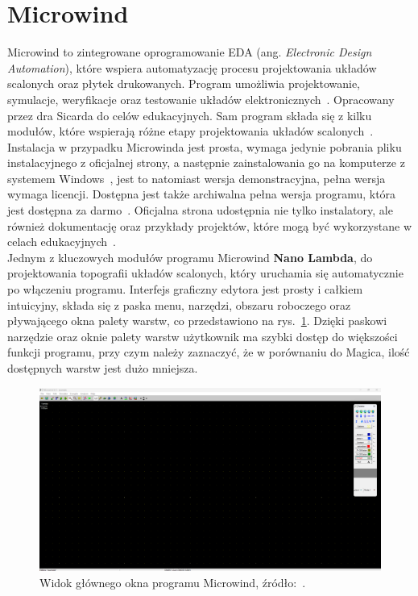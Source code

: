 \section{Microwind}

Microwind to zintegrowane oprogramowanie EDA (ang. \textit{Electronic Design Automation}),
które wspiera automatyzację procesu projektowania układów scalonych oraz płytek drukowanych.
Program umożliwia projektowanie, symulacje, weryfikacje oraz testowanie układów elektronicznych~\cite{eda}.
Opracowany przez dra Sicarda do celów edukacyjnych.
Sam program składa się z kilku modułów,
które wspierają różne etapy projektowania układów scalonych~\cite{Microwind}.
Instalacja w przypadku Microwinda jest prosta, wymaga jedynie pobrania pliku instalacyjnego z oficjalnej strony,
a następnie zainstalowania go na komputerze z systemem Windows~\cite{Microwind},
jest to natomiast wersja demonstracyjna, pełna wersja wymaga licencji.
Dostępna jest także archiwalna pełna wersja programu, która jest dostępna za darmo~\cite{old_microwind}.
Oficjalna strona udostępnia nie tylko instalatory, ale również dokumentację oraz przykłady projektów,
które mogą być wykorzystane w celach edukacyjnych~\cite{Microwind}.\\
\indent Jednym z kluczowych modułów programu Microwind \textbf{Nano Lambda},
do projektowania topografii układów scalonych,
który uruchamia się automatycznie po włączeniu programu.
Interfejs graficzny edytora jest prosty i całkiem intuicyjny,
składa się z paska menu, narzędzi, obszaru roboczego oraz pływającego okna palety warstw,
co przedstawiono na rys.~\ref{fig:microwind_okno}.
Dzięki paskowi narzędzie oraz oknie palety warstw użytkownik ma szybki dostęp do większości funkcji programu,
przy czym należy zaznaczyć, że w porównaniu do Magica, ilość dostępnych warstw jest dużo mniejsza.

\begin{figure}[h]
    \centering
    \includegraphics[width=.9\textwidth]{chapters/chapter2/img/microwind_okno}
    \caption[Widok głównego okna programu Microwind.]{Widok głównego okna programu Microwind, źródło:~\cite{Microwind}.}
    \label{fig:microwind_okno}
\end{figure}


